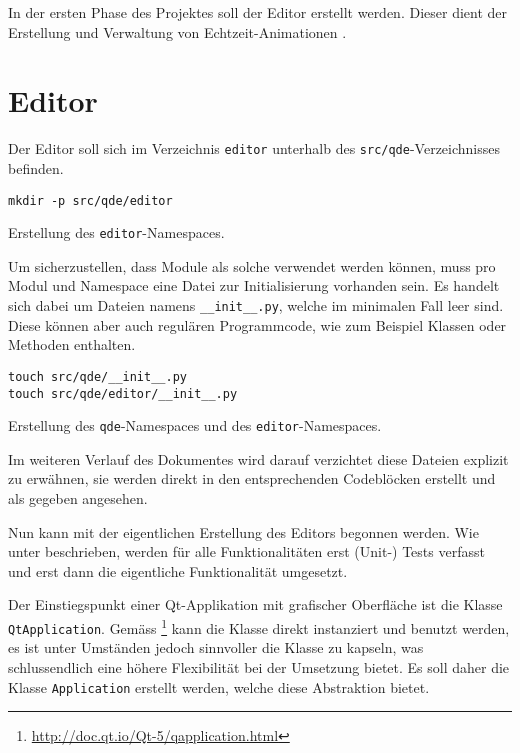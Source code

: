 \documentclass[10pt, openright, notitlepage]{scrreprt}
\begin{document}
In der ersten Phase des Projektes soll der Editor erstellt werden. Dieser dient
der Erstellung und Verwaltung von Echtzeit-Animationen \cite[S. 29]{osterwalder_qde_2016}.

\section{Editor}
\label{sec:orgbd196cd}

Der Editor soll sich im Verzeichnis \texttt{editor} unterhalb des \texttt{src/qde}-Verzeichnisses
befinden.

\begin{listing}[H]
\begin{verbatim}
mkdir -p src/qde/editor
\end{verbatim}
\caption{\label{org414c284}
Erstellung des \texttt{editor}-Namespaces.}
\end{listing}

Um sicherzustellen, dass Module als solche verwendet werden können, muss pro
Modul und Namespace eine Datei zur Initialisierung vorhanden sein. Es handelt sich
dabei um Dateien namens \texttt{\_\_init\_\_.py}, welche im minimalen Fall leer sind. Diese
können aber auch regulären Programmcode, wie zum Beispiel Klassen oder Methoden
enthalten.

\begin{listing}[H]
\begin{verbatim}
touch src/qde/__init__.py
touch src/qde/editor/__init__.py
\end{verbatim}
\caption{\label{orgfedb1e7}
Erstellung des \texttt{qde}-Namespaces und des \texttt{editor}-Namespaces.}
\end{listing}

Im weiteren Verlauf des Dokumentes wird darauf verzichtet diese Dateien explizit
zu erwähnen, sie werden direkt in den entsprechenden Codeblöcken erstellt und
als gegeben angesehen.

Nun kann mit der eigentlichen Erstellung des Editors begonnen werden. Wie unter
\label{org4593466} beschrieben, werden für alle Funktionalitäten erst (Unit-) Tests
verfasst und erst dann die eigentliche Funktionalität umgesetzt.

Der Einstiegspunkt einer Qt-Applikation mit grafischer Oberfläche ist die Klasse
\texttt{QtApplication}. Gemäss \footnote{\url{http://doc.qt.io/Qt-5/qapplication.html}} kann die Klasse direkt instanziert und benutzt
werden, es ist unter Umständen jedoch sinnvoller die Klasse zu kapseln, was
schlussendlich eine höhere Flexibilität bei der Umsetzung bietet. Es soll daher
die Klasse \texttt{Application} erstellt werden, welche diese Abstraktion bietet.
\end{document}
